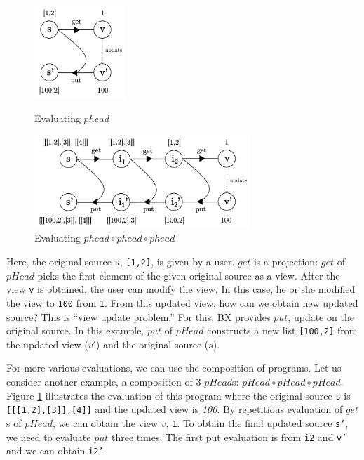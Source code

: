 \begin{figure}[!htb]
  \begin{minipage}{0.3\textwidth}
    \centering
    \includegraphics[height=3.5cm]{./fig/fig1.png}
    \caption{Evaluating $phead$}
    \label{fig:eval-phead}
  \end{minipage}\hfill
  \begin{minipage}{0.7\textwidth}
    \centering
    \includegraphics[height=3.5cm]{./fig/fig2.png}
    \caption{Evaluating $phead \circ phead \circ phead$}
    \label{fig:eval-comp-phead}
  \end{minipage}
\end{figure}

Here, the original source \texttt{s}, \texttt{[1,2]}, is given by a user. $get$ is a projection: $get$ of $pHead$ picks the first element of the given original source as a view.
After the view \texttt{v} is obtained, the user can modify the view.
In this case, he or she modified the view to \texttt{100} from \texttt{1}.
From this updated view, how can we obtain new updated source? This is ``view update problem.'' For this, BX provides $put$, update on the original source.
In this example, $put$ of $pHead$ constructs a new list \texttt{[100,2]} from the updated view ($v'$) and the original source ($s$).

For more various evaluations, we can use the composition of programs. Let us consider another example, a composition of 3 $pHead$s: $pHead \circ pHead \circ pHead$. Figure \ref{fig:eval-comp-phead} illustrates the evaluation of this program where the original source \texttt{s} is \texttt{[[[1,2],[3]],[4]]} and the updated view is \textit{100}.
By repetitious evaluation of $get$s of $pHead$, we can obtain the view $v$, \texttt{1}. To obtain the final updated source \texttt{s'}, we need to evaluate $put$ three times. The first put evaluation is from \texttt{i2} and \texttt{v'} and we can obtain \texttt{i2'}.

